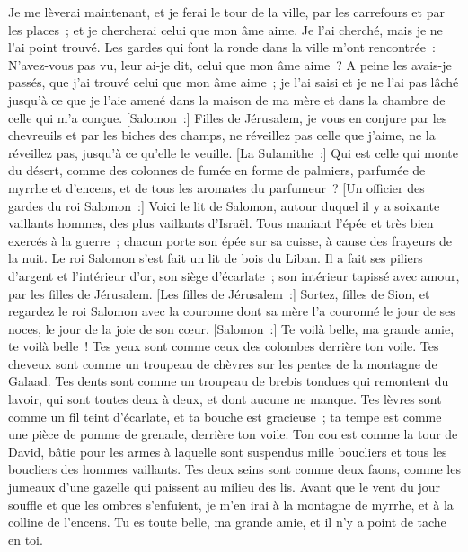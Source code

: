\begin{multicols}{2}
Je me lèverai maintenant, et je ferai le tour de la ville, par les carrefours et par les places~; et je chercherai celui que mon âme aime. Je l'ai cherché, mais je ne l'ai point trouvé.
Les gardes qui font la ronde dans la ville m'ont rencontrée~: N'avez-vous pas vu, leur ai-je dit, celui que mon âme aime~?
A peine les avais-je passés, que j'ai trouvé celui que mon âme aime~; je l'ai saisi et je ne l'ai pas lâché jusqu'à ce que je l'aie amené dans la maison de ma mère et dans la chambre de celle qui m'a conçue.
[Salomon~:] Filles de Jérusalem, je vous en conjure par les chevreuils et par les biches des champs, ne réveillez pas celle que j'aime, ne la réveillez pas, jusqu'à ce qu'elle le veuille.
[La Sulamithe~:] Qui est celle qui monte du désert, comme des colonnes de fumée en forme de palmiers, parfumée de myrrhe et d'encens, et de tous les aromates du parfumeur~?
[Un officier des gardes du roi Salomon~:] Voici le lit de Salomon, autour duquel il y a soixante vaillants hommes, des plus vaillants d'Israël.
Tous maniant l'épée et très bien exercés à la guerre~; chacun porte son épée sur sa cuisse, à cause des frayeurs de la nuit.
Le roi Salomon s'est fait un lit de bois du Liban.
Il a fait ses piliers d'argent et l'intérieur d'or, son siège d'écarlate~; son intérieur tapissé avec amour, par les filles de Jérusalem.
[Les filles de Jérusalem~:] Sortez, filles de Sion, et regardez le roi Salomon avec la couronne dont sa mère l'a couronné le jour de ses noces, le jour de la joie de son cœur.
\VerseOne{}[Salomon~:] Te voilà belle, ma grande amie, te voilà belle~! Tes yeux sont comme ceux des colombes derrière ton voile. Tes cheveux sont comme un troupeau de chèvres sur les pentes de la montagne de Galaad.
Tes dents sont comme un troupeau de brebis tondues qui remontent du lavoir, qui sont toutes deux à deux, et dont aucune ne manque.
Tes lèvres sont comme un fil teint d'écarlate, et ta bouche est gracieuse~; ta tempe est comme une pièce de pomme de grenade, derrière ton voile.
Ton cou est comme la tour de David, bâtie pour les armes à laquelle sont suspendus mille boucliers et tous les boucliers des hommes vaillants.
Tes deux seins sont comme deux faons, comme les jumeaux d'une gazelle qui paissent au milieu des lis.
Avant que le vent du jour souffle et que les ombres s'enfuient, je m'en irai à la montagne de myrrhe, et à la colline de l'encens.
Tu es toute belle, ma grande amie, et il n'y a point de tache en toi.

\end{multicols}
